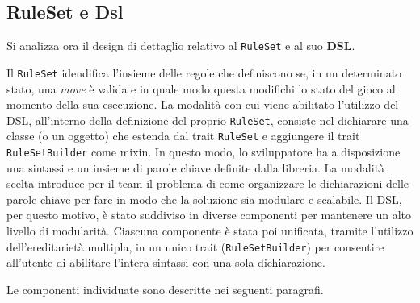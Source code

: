
\subsection{RuleSet e Dsl}\label{sec:dsl_design}

Si analizza ora il design di dettaglio relativo al \texttt{RuleSet} e al suo \textbf{DSL}.

Il \texttt{RuleSet} idendifica l'insieme delle regole che definiscono se, in un determinato stato, una \textit{move} è valida e in quale modo questa modifichi lo stato del gioco al momento della sua esecuzione.
%
La modalità con cui viene abilitato l'utilizzo del DSL, all'interno della definizione del proprio \texttt{RuleSet}, consiste nel dichiarare una classe (o un oggetto) che estenda dal trait \texttt{RuleSet} e aggiungere il trait \texttt{RuleSetBuilder} come mixin.
%
In questo modo, lo sviluppatore ha a disposizione una sintassi e un insieme di parole chiave definite dalla libreria.
%
La modalità scelta introduce per il team il problema di come organizzare le dichiarazioni delle parole chiave per fare in modo che la soluzione sia modulare e scalabile. %
%
Il DSL, per questo motivo, è stato suddiviso in diverse componenti per mantenere un alto livello di modularità.
%
Ciascuna componente è stata poi unificata, tramite l'utilizzo dell'ereditarietà multipla, in un unico trait (\texttt{RuleSetBuilder}) per consentire all'utente di abilitare l'intera sintassi con una sola dichiarazione.

Le componenti individuate sono descritte nei seguenti paragrafi.



